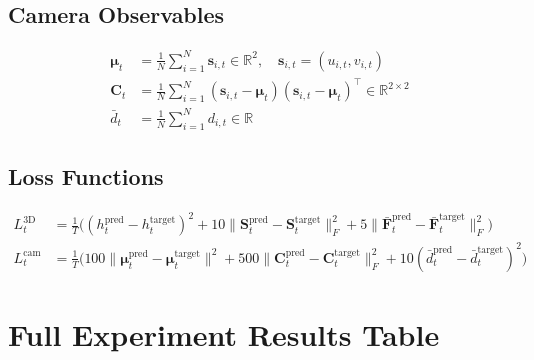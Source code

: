 \documentclass{article}
\begin{document}
\subsection{Camera Observables}
\begin{align}
\boldsymbol{\mu}_t &= \frac{1}{N}\sum_{i=1}^N \mathbf{s}_{i,t} \in\mathbb{R}^2,
\quad \mathbf{s}_{i,t}=(u_{i,t}, v_{i,t}) \label{eq:mean}\\
\mathbf{C}_t &= \frac{1}{N}\sum_{i=1}^N (\mathbf{s}_{i,t}-\boldsymbol{\mu}_t)(\mathbf{s}_{i,t}-\boldsymbol{\mu}_t)^\top \in\mathbb{R}^{2\times2} \label{eq:cov}\\
\bar{d}_t &= \frac{1}{N}\sum_{i=1}^N d_{i,t} \in\mathbb{R} \label{eq:depth}
\end{align}

\subsection{Loss Functions}
\begin{align}
L_t^{\text{3D}} &= \frac{1}{T}\Big((h_t^{\text{pred}}-h_t^{\text{target}})^2
    + 10\lVert\mathbf{S}_t^{\text{pred}}-\mathbf{S}_t^{\text{target}}\rVert_F^2
    + 5\lVert\bar{\mathbf{F}}_t^{\text{pred}}-\bar{\mathbf{F}}_t^{\text{target}}\rVert_F^2\Big)\\
L_t^{\text{cam}} &= \frac{1}{T}\Big(100\lVert\boldsymbol{\mu}_t^{\text{pred}}-\boldsymbol{\mu}_t^{\text{target}}\rVert^2
    + 500\lVert\mathbf{C}_t^{\text{pred}}-\mathbf{C}_t^{\text{target}}\rVert_F^2
    + 10(\bar{d}_t^{\text{pred}}-\bar{d}_t^{\text{target}})^2\Big) \label{eq:camloss}
\end{align}

\section{Full Experiment Results Table}
\end{document}
